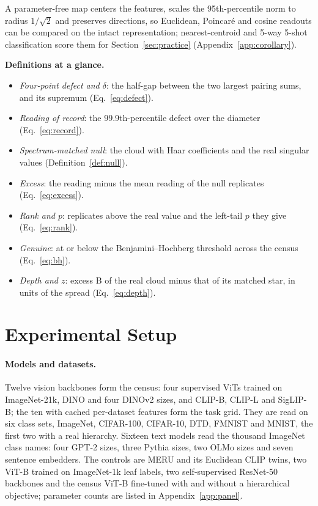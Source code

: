 \documentclass{article}
\theoremstyle{definition}
\begin{document}
A parameter-free map centers the features, scales the 95th-percentile norm to radius $1/\sqrt2$ and preserves directions, so Euclidean, Poincar\'{e} and cosine readouts can be compared on the intact representation; nearest-centroid and 5-way 5-shot classification score them for Section~\ref{sec:practice} (Appendix~\ref{app:corollary}). %

\begin{shaded}
\textbf{Definitions at a glance.}
\begin{itemize}[topsep=1pt,itemsep=0pt,leftmargin=*]
\item \emph{Four-point defect and $\delta$}: the half-gap between the two largest pairing sums, and its supremum (Eq.~\ref{eq:defect}).
\item \emph{Reading of record}: the 99.9th-percentile defect over the diameter (Eq.~\ref{eq:record}).
\item \emph{Spectrum-matched null}: the cloud with Haar coefficients and the real singular values (Definition~\ref{def:null}).
\item \emph{Excess}: the reading minus the mean reading of the null replicates (Eq.~\ref{eq:excess}).
\item \emph{Rank and $p$}: replicates above the real value and the left-tail $p$ they give (Eq.~\ref{eq:rank}).
\item \emph{Genuine}: at or below the Benjamini--Hochberg threshold across the census (Eq.~\ref{eq:bh}).
\item \emph{Depth and $z$}: excess B of the real cloud minus that of its matched star, in units of the spread (Eq.~\ref{eq:depth}).
\end{itemize}
\end{shaded}

\section{Experimental Setup}
\label{sec:v2-setup}

\paragraph{Models and datasets.} Twelve vision backbones form the census: four supervised ViTs trained on ImageNet-21k, DINO and four DINOv2 sizes, and CLIP-B, CLIP-L and SigLIP-B; the ten with cached per-dataset features form the task grid. They are read on six class sets, ImageNet, CIFAR-100, CIFAR-10, DTD, FMNIST and MNIST, the first two with a real hierarchy. Sixteen text models read the thousand ImageNet class names: four GPT-2 sizes, three Pythia sizes, two OLMo sizes and seven sentence embedders. The controls are MERU and its Euclidean CLIP twins, two ViT-B trained on ImageNet-1k leaf labels, two self-supervised ResNet-50 backbones and the census ViT-B fine-tuned with and without a hierarchical objective; parameter counts are listed in Appendix~\ref{app:panel}.
\end{document}
